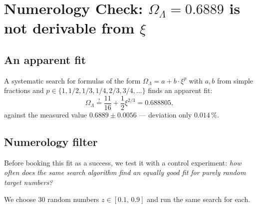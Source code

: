 \section[Numerology check: Omega-Lambda is not derivable from xi]{Numerology Check: \texorpdfstring{\(\Omega_\Lambda = 0.6889\)}{Omega-Lambda = 0.6889} is not derivable from \texorpdfstring{\(\xi\)}{xi}}
\label{sec:numerologie}

\subsection{An apparent fit}

A systematic search for formulas of the form \(\Omega_\Lambda = a + b \cdot \xi^p\) with \(a, b\) from simple fractions and \(p \in \{1, 1/2, 1/3, 1/4, 2/3, 3/4, \dots\}\) finds an apparent fit:
\begin{equation}
\Omega_\Lambda \stackrel{?}{=} \frac{11}{16} + \frac{1}{2} \xi^{2/3} = 0.688805,
\end{equation}
against the measured value \(0.6889 \pm 0.0056\) --- deviation only \(0.014\,\%\).

\subsection{Numerology filter}

Before booking this fit as a success, we test it with a control experiment: \emph{how often does the same search algorithm find an equally good fit for purely random target numbers?}

We choose 30 random numbers \(z \in [0.1,\, 0.9]\) and run the same search for each.

\begin{table}[h]
\centering
\caption{Numerology filter: distribution of random ``hits''}
\end{table}

